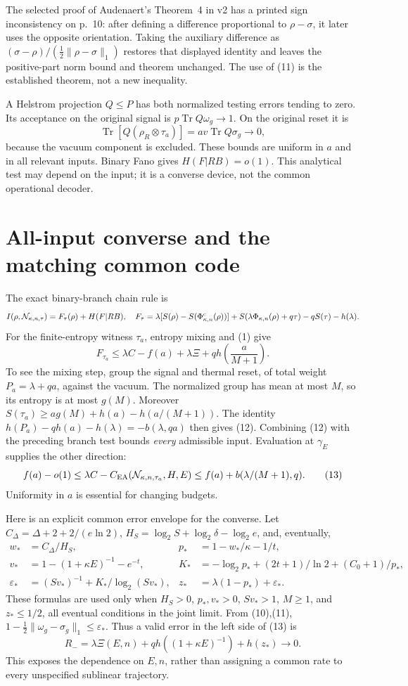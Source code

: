 \documentclass[11pt]{article}
\newcommand{\Tr}{\operatorname{Tr}}
\newcommand{\CEA}{C_{\mathrm{EA}}}
\newcommand{\PhiT}{\Phi_{\kappa,n}}
\begin{document}
The selected proof of Audenaert's Theorem~4 in v2 has a printed sign
inconsistency on p.~10: after defining a difference proportional to
\(\rho-\sigma\), it later uses the opposite orientation.
Taking the auxiliary difference as \((\sigma-\rho)/
(\tfrac12\|\rho-\sigma\|_1)\) restores that displayed identity and
leaves the positive-part norm bound and theorem unchanged.
The use of (11) is the established theorem, not a new inequality.

A Helstrom projection \(Q\le P\) has both normalized testing errors
tending to zero. Its acceptance on the original signal is
\(p\Tr Q\omega_g\to1\). On the original reset it is
\[
 \Tr[Q(\rho_R\otimes\tau_a)]=av\Tr Q\sigma_g\to0,
\]
because the vacuum component is excluded. These bounds are uniform in
\(a\) and in all relevant inputs. Binary Fano gives \(H(F|RB)=o(1)\).
This analytical test may depend on the input; it is a converse device,
not the common operational decoder.

\section{All-input converse and the matching common code}
The exact binary-branch chain rule is
\[
 I(\rho,{\cal N}_{\kappa,n,\tau})=F_\tau(\rho)+H(F|RB),
\quad
 F_\tau=\lambda[S(\rho)-S(\PhiT^c(\rho))]
 +S(\lambda\PhiT(\rho)+q\tau)-qS(\tau)-h(\lambda).
\]
For the finite-entropy witness \(\tau_a\), entropy mixing and (1) give
\[
 F_{\tau_a}\le\lambda C-f(a)+\lambda\Xi
                        +qh\!\left(\frac a{M+1}\right).
 \tag{12}
\]
To see the mixing step, group the signal and thermal reset, of total
weight \(P_a=\lambda+qa\), against the vacuum. The normalized group
has mean at most \(M\), so its entropy is at most \(g(M)\).
Moreover \(S(\tau_a)\ge ag(M)+h(a)-h(a/(M+1))\).
The identity \(h(P_a)-qh(a)-h(\lambda)=-b(\lambda,qa)\)
then gives (12).
Combining (12) with the preceding branch test bounds \emph{every}
admissible input. Evaluation at \(\gamma_E\) supplies the other direction:
\[
 f(a)-o(1)\le
 \lambda C-\CEA({\cal N}_{\kappa,n,\tau_a},H,E)
 \le f(a)+b(\lambda/(M+1),q).                               \tag{13}
\]
Uniformity in \(a\) is essential for changing budgets.

Here is an explicit common error envelope for the converse.
Let \(C_\Delta=\Delta+2+2/(e\ln2)\),
\(H_S=\log_2S+\log_2\delta-\log_2e\), and, eventually,
\[
\begin{aligned}
 w_*&=C_\Delta/H_S,& p_*&=1-w_*/\kappa-1/t,\\
 v_*&=1-(1+\kappa E)^{-1}-e^{-t},&
 K_*&=-\log_2p_*+(2t+1)/\ln2+(C_0+1)/p_*,\\
 \varepsilon_*&=(Sv_*)^{-1}+K_*/\log_2(Sv_*),&
 z_*&=\lambda(1-p_*)+\varepsilon_* .
\end{aligned}
\]
These formulas are used only when \(H_S>0\), \(p_*,v_*>0\),
\(Sv_*>1\), \(M\ge1\), and \(z_*\le1/2\), all eventual
conditions in the joint limit. From (10),(11),
\(1-\tfrac12\|\omega_g-\sigma_g\|_1\le\varepsilon_*\).
Thus a valid error in the left side of (13) is
\[
 R_-=\lambda\Xi(E,n)+qh((1+\kappa E)^{-1})+h(z_*)\longrightarrow0.
 \tag{13a}
\]
This exposes the dependence on \(E,n\), rather than assigning a common
rate to every unspecified sublinear trajectory.
\end{document}
